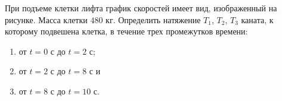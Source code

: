 При подъеме клетки лифта график скоростей имеет вид, изображенный на рисунке.
Масса клетки $480$ кг.
Определить натяжение $T_1$, $T_2$, $T_3$ каната, к которому подвешена клетка,
в течение трех промежутков времени:
\begin{enumerate}
\item от $t = 0$ с до $t = 2$ с;
\item от $t = 2$ с до $t = 8$ с и
\item от $t = 8$ с до $t = 10$ с.
\end{enumerate}

